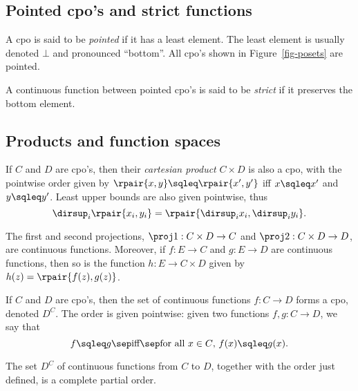 \documentclass[12pt]{article}
\begin{document}
\subsection{Pointed cpo's and strict functions}

\begin{definition}
  A cpo is said to be {\em pointed} if it has a least element. The
  least element is usually denoted $\bot$ and pronounced ``bottom''.
  All cpo's shown in Figure~\ref{fig-posets} are pointed.

  A continuous function between pointed cpo's is said to be {\em
  strict} if it preserves the bottom element.
\end{definition}

\subsection{Products and function spaces}

If $C$ and $D$ are cpo's, then their {\em cartesian product} $C\times
D$ is also a cpo, with the pointwise order given by
$\rpair{x,y}\sqleq\rpair{x',y'}$ iff $x\sqleq x'$ and $y\sqleq y'$.
Least upper bounds are also given pointwise, thus
\[ \dirsup_i\rpair{x_i,y_i} = \rpair{\dirsup_i x_i,\dirsup_i y_i}.
\]

\begin{proposition}\label{prop-cpo-products}
  The first and second projections, $\proj1:C\times D\to C$ and
  $\proj2:C\times D\to D$, are continuous functions. Moreover, if
  $f:E\to C$ and $g:E\to D$ are continuous functions, then so is the
  function $h:E\to C\times D$ given by $h(z)=\rpair{f(z),g(z)}$.
\end{proposition}

If $C$ and $D$ are cpo's, then the set of continuous functions $f:C\to
D$ forms a cpo, denoted $D^C$. The order is given pointwise: given two
functions $f,g:C\to D$, we say that
\[ f\sqleq g \sep\mbox{iff}\sep \mbox{for all $x\in C$, $f(x)\sqleq
  g(x)$}.
\]

\begin{proposition}
  The set $D^C$ of continuous functions from $C$ to $D$, together with
  the order just defined, is a complete partial order.
\end{proposition}
\end{document}
